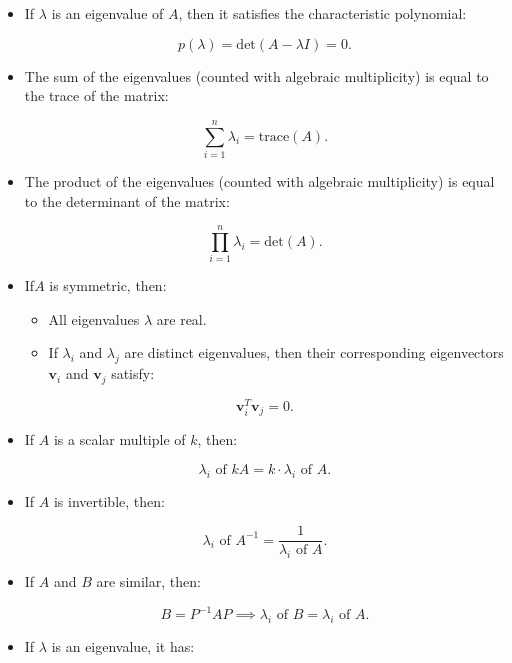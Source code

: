 \documentclass[
  letterpaper,
  DIV=11,
  numbers=noendperiod]{scrreprt}
\providecommand{\tightlist}{%
  \setlength{\itemsep}{0pt}\setlength{\parskip}{0pt}}\usepackage{longtable,booktabs,array}
\theoremstyle{plain}
\theoremstyle{definition}
\theoremstyle{remark}
\begin{document}
\begin{tcolorbox}[enhanced jigsaw, leftrule=.75mm, bottomtitle=1mm, colback=white, toptitle=1mm, opacitybacktitle=0.6, toprule=.15mm, colbacktitle=quarto-callout-note-color!10!white, arc=.35mm, colframe=quarto-callout-note-color-frame, title=\textcolor{quarto-callout-note-color}{\faInfo}\hspace{0.5em}{Properties of Eigen values}, titlerule=0mm, rightrule=.15mm, left=2mm, bottomrule=.15mm, breakable, coltitle=black, opacityback=0]

\begin{itemize}
\item
  If \(\lambda\) is an eigenvalue of \(A\), then it satisfies the
  characteristic polynomial:

  \[
  p(\lambda) = \text{det}(A - \lambda I) = 0.
  \]
\item
  The sum of the eigenvalues (counted with algebraic multiplicity) is
  equal to the trace of the matrix:

  \[
  \sum_{i=1}^{n} \lambda_i = \text{trace}(A).
  \]
\item
  The product of the eigenvalues (counted with algebraic multiplicity)
  is equal to the determinant of the matrix:

  \[
  \prod_{i=1}^{n} \lambda_i = \text{det}(A).
  \]
\item
  If\(A\) is symmetric, then:

  \begin{itemize}
  \tightlist
  \item
    All eigenvalues \(\lambda\) are real.
  \item
    If \(\lambda_i\) and \(\lambda_j\) are distinct eigenvalues, then
    their corresponding eigenvectors \(\mathbf{v}_i\) and
    \(\mathbf{v}_j\) satisfy:
  \end{itemize}

  \[
  \mathbf{v}_i^T \mathbf{v}_j = 0.
  \]
\item
  If \(A\) is a scalar multiple of \(k\), then:

  \[
  \lambda_i \text{ of } kA = k \cdot \lambda_i \text{ of } A.
  \]
\item
  If \(A\) is invertible, then:

  \[
  \lambda_i \text{ of } A^{-1} = \frac{1}{\lambda_i \text{ of } A}.
  \]
\item
  If \(A\) and \(B\) are similar, then:

  \[
  B = P^{-1} A P \implies \lambda_i \text{ of } B = \lambda_i \text{ of } A.
  \]
\item
  If \(\lambda\) is an eigenvalue, it has:


\end{itemize}
\end{tcolorbox}
\end{document}
